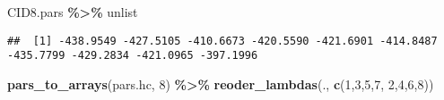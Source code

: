 \documentclass[
]{article}
\newenvironment{Shaded}{\begin{snugshade}}{\end{snugshade}}
\newcommand{\DecValTok}[1]{\textcolor[rgb]{0.00,0.00,0.81}{#1}}
\newcommand{\FunctionTok}[1]{\textcolor[rgb]{0.13,0.29,0.53}{\textbf{#1}}}
\newcommand{\NormalTok}[1]{#1}
\newcommand{\SpecialCharTok}[1]{\textcolor[rgb]{0.81,0.36,0.00}{\textbf{#1}}}
\begin{document}
\begin{Shaded}
\begin{Highlighting}[]
\NormalTok{CID8.pars }\SpecialCharTok{\%\textgreater{}\%}\NormalTok{ unlist}
\end{Highlighting}
\end{Shaded}

\begin{verbatim}
##  [1] -438.9549 -427.5105 -410.6673 -420.5590 -421.6901 -414.8487 -435.7799 -429.2834 -421.0965 -397.1996
\end{verbatim}

\begin{Shaded}
\begin{Highlighting}[]
\FunctionTok{pars\_to\_arrays}\NormalTok{(pars.hc, }\DecValTok{8}\NormalTok{) }\SpecialCharTok{\%\textgreater{}\%} \FunctionTok{reoder\_lambdas}\NormalTok{(., }\FunctionTok{c}\NormalTok{(}\DecValTok{1}\NormalTok{,}\DecValTok{3}\NormalTok{,}\DecValTok{5}\NormalTok{,}\DecValTok{7}\NormalTok{, }\DecValTok{2}\NormalTok{,}\DecValTok{4}\NormalTok{,}\DecValTok{6}\NormalTok{,}\DecValTok{8}\NormalTok{))}
\end{Highlighting}
\end{Shaded}
\end{document}
